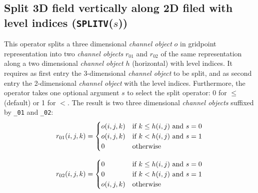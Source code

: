 \documentclass[twoside]{article}
\begin{document}
\subsection{Split 3D field vertically along 2D filed with level indices ({\tt SPLITV}($s$))}
\label{sec:splitv}
This operator splits a three dimensional {\it channel object} $o$ in gridpoint
representation into two {\it channel objects} $r_{01}$ and $r_{02}$ of the
same representation along a two dimensional {\it channel object} $h$
(horizontal) with level indices.
%
It requires as first entry the 3-dimensional {\it channel object} to be split,
and as second entry the 2-dimensional {\it channel object} with the
level indices. Furthermore, the operator takes one optional argument $s$ to
select the split operator: 0 for $\le$ (default) or 1 for $<$.
The result is two three dimensional {\it channel objects} suffixed
by {\tt \_01} and {\tt \_02}:
%
\begin{equation}
  r_{01}(i,j,k) =
\begin{cases}
  o(i,j,k) &\text{if } k \le h(i,j) \text{ and }  s = 0\\
  o(i,j,k) &\text{if } k < h(i,j)   \text{ and }  s = 1\\
  0        &\text{otherwise}
\end{cases}\\
\end{equation}

\begin{equation}
  r_{02}(i,j,k) =
\begin{cases}
  0         &\text{if } k \le h(i,j) \text{ and }  s = 0\\
  0         &\text{if } k < h(i,j)   \text{ and }  s = 1\\
  o(i,j,k)  &\text{otherwise}
\end{cases}\\
\end{equation}

\end{document}

